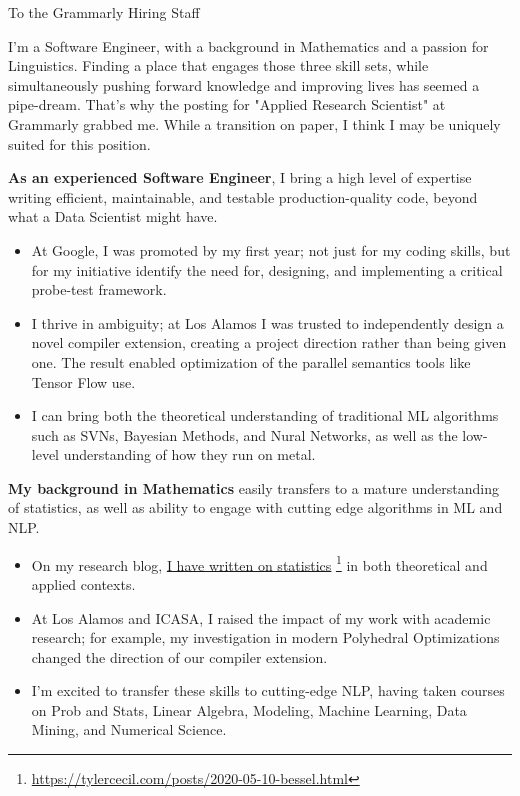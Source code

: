 \documentclass[a4paper]{article}
\newcommand{\cvcolor}[1]{{\color{MidnightBlue}#1}}
\renewcommand{\hl}[1]{\cvcolor{\textbf{#1}}}
\renewcommand{\cite}[2]{\href{#2}{\ul{#1}} \footnote{\href{#2}{#2}}}
\begin{document}
\begin{adjustwidth}{40pt}{40pt}

  To the Grammarly Hiring Staff \par \bigskip

  I'm a Software Engineer, with a background in Mathematics and a passion for
  Linguistics. Finding a place that engages those three skill sets, while
  simultaneously pushing forward knowledge and improving lives has seemed a
  pipe-dream. That's why the posting for "Applied Research Scientist" at
  Grammarly grabbed me. While a transition on paper, I think I may be uniquely
  suited for this position. \medskip


  \hl{As an experienced Software Engineer}, I bring a high level of expertise
  writing efficient, maintainable, and testable production-quality code, beyond
  what a Data Scientist might have.

  \begin{itemize}
    \item At Google, I was promoted by my first year; not just for my coding
      skills, but for my initiative identify the need for, designing, and
      implementing a critical probe-test framework.
    \item I thrive in ambiguity; at Los Alamos I was trusted to independently
      design a novel compiler extension, creating a project direction rather
      than being given one. The result enabled optimization of the parallel
      semantics tools like Tensor Flow use.
    \item I can bring both the theoretical understanding of traditional ML
      algorithms such as SVNs, Bayesian Methods, and Nural Networks, as well as
      the low-level understanding of how they run on metal.
  \end{itemize} \medskip

  \hl{My background in Mathematics} easily transfers to a mature understanding
  of statistics, as well as ability to engage with cutting edge algorithms in
  ML and NLP.
  \begin{itemize}
    \item On my research blog, \cite{I have written on statistics}
      {https://tylercecil.com/posts/2020-05-10-bessel.html}
      in both theoretical and applied contexts.
    \item At Los Alamos and ICASA, I raised the impact of my work with academic
      research; for example, my investigation in modern Polyhedral
      Optimizations changed the direction of our compiler extension.
    \item I'm excited to transfer these skills to cutting-edge NLP, having
      taken courses on Prob and Stats, Linear Algebra, Modeling, Machine
      Learning, Data Mining, and Numerical Science.
  \end{itemize} \medskip


\end{adjustwidth}
\end{document}
